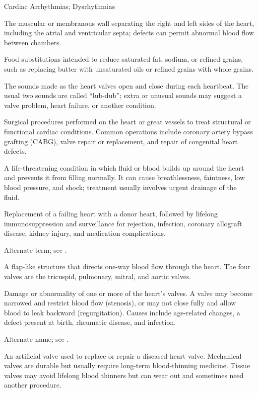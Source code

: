 \synonyms
Cardiac Arrhythmias; Dysrhythmias

 The muscular or membranous wall separating the right and left sides of the heart, including the atrial and ventricular septa; defects can permit abnormal blood flow between chambers.

 Food substitutions intended to reduce saturated fat, sodium, or refined grains, such as replacing butter with unsaturated oils or refined grains with whole grains.

 The sounds made as the heart valves open and close during each heartbeat. The usual two sounds are called “lub-dub”; extra or unusual sounds may suggest a valve problem, heart failure, or another condition.

 Surgical procedures performed on the heart or great vessels to treat structural or
functional cardiac conditions. Common operations include coronary artery bypass grafting
(CABG), valve repair or replacement, and repair of congenital heart defects.

 A life-threatening condition in which fluid or blood builds up around the heart and prevents it from filling normally. It can cause breathlessness, faintness, low blood pressure, and shock; treatment usually involves urgent drainage of the fluid.

 Replacement of a failing heart with a donor heart, followed by lifelong immunosuppression and surveillance for rejection, infection, coronary allograft disease, kidney injury, and medication complications.

 Alternate term; see .

 A flap-like structure that directs one-way blood flow through the heart. The four valves are the tricuspid, pulmonary, mitral, and aortic
valves.

 Damage or abnormality of one or more of the heart's valves. A valve may become narrowed and restrict blood flow (stenosis), or may not close fully and allow blood to leak backward (regurgitation). Causes include age-related changes, a defect present at birth, rheumatic disease, and infection.

 Alternate name; see .

 An artificial valve used to replace or repair a diseased heart valve. Mechanical valves are durable but usually require long-term blood-thinning medicine. Tissue valves may avoid lifelong blood thinners but can wear out and sometimes need another procedure.

